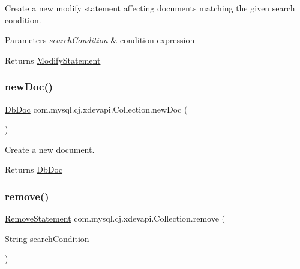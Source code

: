Create a new modify statement affecting documents matching the given search condition.


\begin{DoxyParams}{Parameters}
{\em search\+Condition} & condition expression \\
\hline
\end{DoxyParams}
\begin{DoxyReturn}{Returns}
\mbox{\hyperlink{interfacecom_1_1mysql_1_1cj_1_1xdevapi_1_1_modify_statement}{Modify\+Statement}} 
\end{DoxyReturn}
\mbox{\label{interfacecom_1_1mysql_1_1cj_1_1xdevapi_1_1_collection_a3f57db07e47da44f25e96c70b301fac1}} 
\subsubsection{\texorpdfstring{new\+Doc()}{newDoc()}}
{\footnotesize\ttfamily \mbox{\hyperlink{interfacecom_1_1mysql_1_1cj_1_1xdevapi_1_1_db_doc}{Db\+Doc}} com.\+mysql.\+cj.\+xdevapi.\+Collection.\+new\+Doc (\begin{DoxyParamCaption}{ }\end{DoxyParamCaption})}

Create a new document.

\begin{DoxyReturn}{Returns}
\mbox{\hyperlink{interfacecom_1_1mysql_1_1cj_1_1xdevapi_1_1_db_doc}{Db\+Doc}} 
\end{DoxyReturn}
\mbox{\label{interfacecom_1_1mysql_1_1cj_1_1xdevapi_1_1_collection_aff45631a403d8370067af7c4f0a4fab1}} 
\subsubsection{\texorpdfstring{remove()}{remove()}}
{\footnotesize\ttfamily \mbox{\hyperlink{interfacecom_1_1mysql_1_1cj_1_1xdevapi_1_1_remove_statement}{Remove\+Statement}} com.\+mysql.\+cj.\+xdevapi.\+Collection.\+remove (\begin{DoxyParamCaption}\item[{String}]{search\+Condition }\end{DoxyParamCaption})}

